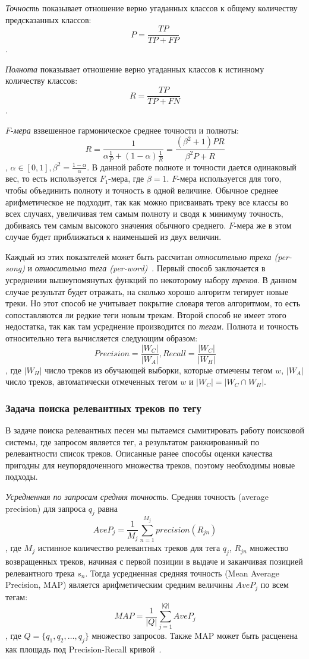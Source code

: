 \emph{Точность} показывает отношение верно угаданных классов к общему количеству предсказанных классов:
$$P = \frac{TP}{TP + FP}$$.

\emph{Полнота} показывает отношение верно угаданных классов к истинному количеству классов:
$$R = \frac{TP}{TP + FN}$$.

$F$-\emph{мера} \ld взвешенное гармоническое среднее точности и полноты:
$$R = \frac{1}{\alpha\frac{1}{P} + (1 - \alpha)\frac{1}{R}} = \frac{(\beta^2 + 1)PR}{\beta^2P + R}$$, 
$\alpha \in [0, 1], \beta^2 = \frac{1-\alpha}{\alpha}$. В данной работе полноте и точности дается одинаковый вес, то есть используется $F_1$-мера, где $\beta = 1$.
$F$-мера используется для того, чтобы объединить полноту и точность в одной величине. Обычное среднее арифметическое не подходит, так как можно присваивать треку 
все классы во всех случаях, увеличивая тем самым полноту и сводя к минимуму точность, добиваясь тем самым высокого значения обычного среднего. $F$-мера же в этом случае
будет приближаться к наименьшей из двух величин.

Каждый из этих показателей может быть рассчитан \emph{относительно трека (per-song)} и \emph{относительно тега (per-word)}~\cite{msordo_thesis, turnbull}.
Первый способ заключается в усреднении вышеупомянутых функций по некоторому набору \emph{треков}. В данном случае результат будет отражать, на сколько хорошо алгоритм тегирует новые треки.
Но этот способ не учитывает покрытие словаря тегов алгоритмом, то есть сопоставляются ли редкие теги новым трекам. Второй способ не имеет этого недостатка, так как там усреднение
производится по \emph{тегам}. Полнота и точность относительно тега вычисляется следующим образом:
$$ Precision = \frac{|W_C|}{|W_A|}, Recall = \frac{|W_C|}{|W_H|} $$,
где $|W_H|$ \ld число треков из обучающей выборки, которые отмечены тегом $w$, $|W_A|$ \ld число треков, автоматически отмеченных тегом $w$ и $|W_C| = |W_C \cap W_H|$.

\subsubsection{Задача поиска релевантных треков по тегу}

В задаче поиска релевантных песен мы пытаемся сымитировать работу поисковой системы, где запросом является тег, а результатом \ld ранжированный по релевантности список треков.
Описанные ранее способы оценки качества пригодны для неупорядоченного множества треков, поэтому необходимы новые подходы.

\emph{Усредненная по запросам средняя точность}. Средняя точность (average precision) для запроса $q_j$ равна 
$$ AveP_j = \frac{1}{M_j} \sum_{n=1}^{M_j} precision(R_{jn})$$,
где $M_j$ \ld истинное количество релевантных треков для тега $q_j$, $R_{jn}$ \ld множество возвращенных треков, начиная с первой позиции в выдаче и заканчивая позицией 
релевантного трека $s_n$. Тогда усредненная средняя точность (Mean Average Precision, MAP) является арифметическим средним величины $AveP_j$ по всем тегам:
$$ MAP = \frac{1}{|Q|} \sum_{j=1}^{|Q|} AveP_j $$, где $Q = \{q_1, q_2, \ldots, q_j\}$ \ld множество запросов. 
Также MAP может быть расценена как площадь под Precision-Recall кривой~\cite{prec_recall, turnbull}.

